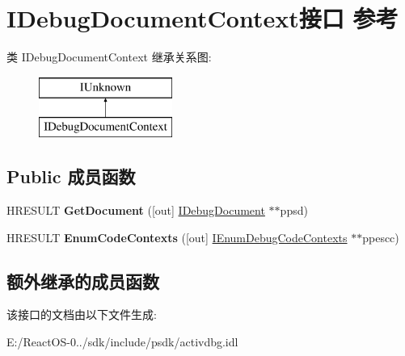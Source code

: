 \hypertarget{interface_i_debug_document_context}{}\section{I\+Debug\+Document\+Context接口 参考}
\label{interface_i_debug_document_context}
类 I\+Debug\+Document\+Context 继承关系图\+:\begin{figure}[H]
\begin{center}
\leavevmode
\includegraphics[height=2.000000cm]{interface_i_debug_document_context}
\end{center}
\end{figure}
\subsection*{Public 成员函数}
\begin{DoxyCompactItemize}
\item 
\mbox{\label{interface_i_debug_document_context_a4705b950a62f15d65c551a7603b48e92}} 
H\+R\+E\+S\+U\+LT {\bfseries Get\+Document} (\mbox{[}out\mbox{]} \hyperlink{interface_i_debug_document}{I\+Debug\+Document} $\ast$$\ast$ppsd)
\item 
\mbox{\label{interface_i_debug_document_context_a69b3e7a27e52a9d8e3dc4372f05cb905}} 
H\+R\+E\+S\+U\+LT {\bfseries Enum\+Code\+Contexts} (\mbox{[}out\mbox{]} \hyperlink{interface_i_enum_debug_code_contexts}{I\+Enum\+Debug\+Code\+Contexts} $\ast$$\ast$ppescc)
\end{DoxyCompactItemize}
\subsection*{额外继承的成员函数}


该接口的文档由以下文件生成\+:\begin{DoxyCompactItemize}
\item 
E\+:/\+React\+O\+S-\/0../sdk/include/psdk/activdbg.\+idl\end{DoxyCompactItemize}
